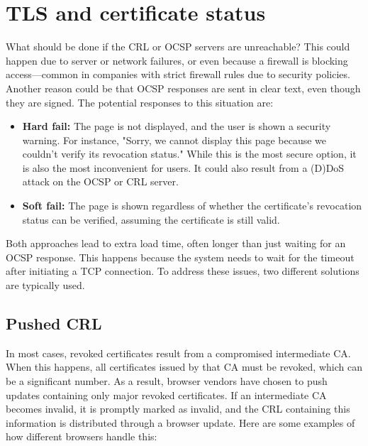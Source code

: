 \section{TLS and certificate status}
What should be done if the CRL or OCSP servers are unreachable? This
could happen due to server or network failures, or even because a
firewall is blocking access—common in companies with strict firewall
rules due to security policies. Another reason could be that OCSP
responses are sent in clear text, even though they are signed. The
potential responses to this situation are:

\begin{itemize}
    \item \textbf{Hard fail:} The page is not displayed, and the user
      is shown a security warning. For instance, "Sorry, we cannot
      display this page because we couldn't verify its revocation
      status." While this is the most secure option, it is also the
      most inconvenient for users. It could also result from a (D)DoS
      attack on the OCSP or CRL server.
    
    \item \textbf{Soft fail:} The page is shown regardless of whether
      the certificate's revocation status can be verified, assuming
      the certificate is still valid.
\end{itemize}

Both approaches lead to extra load time, often longer than just
waiting for an OCSP response. This happens because the system needs to
wait for the timeout after initiating a TCP connection. To address
these issues, two different solutions are typically used.
\subsection{Pushed CRL}
In most cases, revoked certificates result from a compromised
intermediate CA. When this happens, all certificates issued by that CA
must be revoked, which can be a significant number. As a result,
browser vendors have chosen to push updates containing only major
revoked certificates. If an intermediate CA becomes invalid, it is
promptly marked as invalid, and the CRL containing this information is
distributed through a browser update. Here are some examples of how
different browsers handle this:

